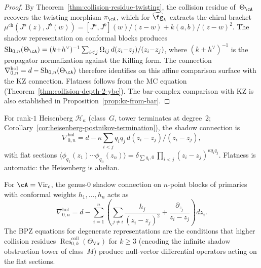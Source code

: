 \begin{proof}
By Theorem~\ref{thm:collision-residue-twisting}, the collision residue
of~$\Theta_\cA$ recovers the twisting morphism $\pi_\cA$, which for
$\widehat{\fg}_k$ extracts the chiral bracket
$\mu^{\mathrm{ch}}(J^a(z), J^b(w)) =
[J^a, J^b](w)/(z{-}w) + k(a,b)/(z{-}w)^2$.
The shadow representation on conformal blocks produces
$\operatorname{Sh}_{0,n}(\Theta_\cA) =
(k{+}h^\vee)^{-1} \sum_{i<j} \Omega_{ij}\, d(z_i{-}z_j)/(z_i{-}z_j)$,
where $(k{+}h^\vee)^{-1}$ is the propagator normalization
against the Killing form.
The connection $\nabla^{\mathrm{hol}}_{0,n} =
d - \operatorname{Sh}_{0,n}(\Theta_\cA)$ therefore identifies on this
affine comparison surface with the KZ connection. Flatness follows from the MC equation
(Theorem~\ref{thm:collision-depth-2-ybe}).
The bar-complex comparison with KZ
is also established in Proposition~\ref{prop:kz-from-bar}.
\end{proof}

\begin{corollary}
\label{cor:shadow-connection-heisenberg}
For rank-$1$ Heisenberg $\mathcal{H}_\kappa$ \textup{(}class~$G$,
tower terminates at degree~$2$;
Corollary~\textup{\ref{cor:heisenberg-postnikov-termination})}, the
shadow connection is
\begin{equation}\label{eq:heisenberg-shadow-connection}
\nabla^{\mathrm{hol}}_{0,n}
=
d - \kappa
\sum_{i < j} q_i q_j\, d(z_i - z_j)/(z_i - z_j),
\end{equation}
with flat sections
$\langle \phi_{q_1}(z_1) \dotsm \phi_{q_n}(z_n) \rangle
= \delta_{\sum q_i,0}\,
\prod_{i<j} (z_i - z_j)^{\kappa q_i q_j}$.
Flatness is automatic: the Heisenberg is abelian.
\end{corollary}

\begin{proposition}
\label{prop:shadow-connection-bpz}
For $\cA = \mathrm{Vir}_c$, the genus-$0$ shadow connection on
$n$-point blocks of primaries with conformal weights
$h_1, \dotsc, h_n$ acts as
\[
\nabla^{\mathrm{hol}}_{0,n}
=
d -
\sum_{i=1}^n \left(
 \sum_{j \neq i} \frac{h_j}{(z_i - z_j)^2}
 +
 \frac{\partial_{z_j}}{z_i - z_j}
\right) dz_i.
\]
The BPZ equations for degenerate representations are the conditions
that higher collision residues
$\operatorname{Res}^{\mathrm{coll}}_{0,k}(\Theta_{\mathrm{Vir}})$
for $k \geq 3$ (encoding the infinite shadow obstruction tower of class~$M$) produce
null-vector differential operators acting on the flat sections.
\end{proposition}


